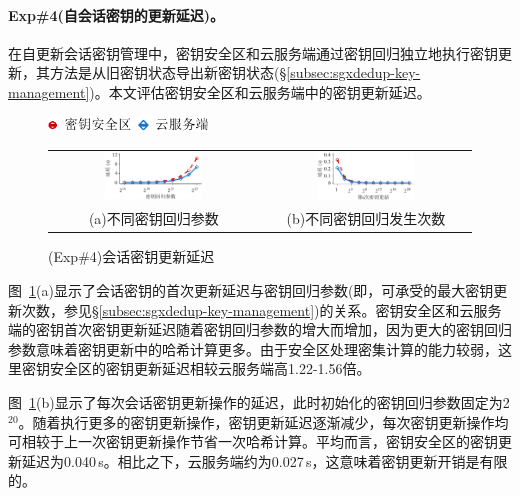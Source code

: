 \paragraph*{Exp\#4(自会话密钥的更新延迟)。}在自更新会话密钥管理中，密钥安全区和云服务端通过密钥回归独立地执行密钥更新，其方法是从旧密钥状态导出新密钥状态(\S\ref{subsec:sgxdedup-key-management})。本文评估密钥安全区和云服务端中的密钥更新延迟。

\begin{figure}[!htb]
  \centering
  \includegraphics[height=11pt]{pic/sgxdedup/plot/exp_a5/expa5_keyRegression_time_legend.pdf}
  \begin{tabular}{@{\ }c@{\ }c}
    \includegraphics[width=0.49\textwidth]{pic/sgxdedup/plot/exp_a5/expa5_keyRegression_time.pdf} & 
    \includegraphics[width=0.49\textwidth]{pic/sgxdedup/plot/exp_a5/expa5_keyRegression_time_default.pdf} \\
    \mbox{\small (a)不同密钥回归参数}                                                             & 
    \mbox{\small (b)不同密钥回归发生次数}
  \end{tabular}
  \caption{(Exp\#4)会话密钥更新延迟}
  \label{fig:sgxdedup-rekeyingLatency}
\end{figure}

图~\ref{fig:sgxdedup-rekeyingLatency}(a)显示了会话密钥的首次更新延迟与密钥回归参数(即，可承受的最大密钥更新次数，参见\S\ref{subsec:sgxdedup-key-management})的关系。密钥安全区和云服务端的密钥首次密钥更新延迟随着密钥回归参数的增大而增加，因为更大的密钥回归参数意味着密钥更新中的哈希计算更多。由于安全区处理密集计算的能力较弱，这里密钥安全区的密钥更新延迟相较云服务端高1.22-1.56倍。

图~\ref{fig:sgxdedup-rekeyingLatency}(b)显示了每次会话密钥更新操作的延迟，此时初始化的密钥回归参数固定为2$^{20}$。随着执行更多的密钥更新操作，密钥更新延迟逐渐减少，每次密钥更新操作均可相较于上一次密钥更新操作节省一次哈希计算。平均而言，密钥安全区的密钥更新延迟为0.040\,s。相比之下，云服务端约为0.027\,s，这意味着密钥更新开销是有限的。

